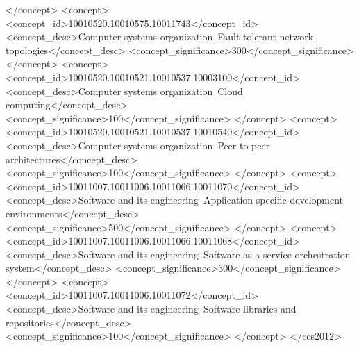 \begin{CCSXML}
       </concept>
   <concept>
       <concept_id>10010520.10010575.10011743</concept_id>
       <concept_desc>Computer systems organization~Fault-tolerant network topologies</concept_desc>
       <concept_significance>300</concept_significance>
       </concept>
   <concept>
       <concept_id>10010520.10010521.10010537.10003100</concept_id>
       <concept_desc>Computer systems organization~Cloud computing</concept_desc>
       <concept_significance>100</concept_significance>
       </concept>
   <concept>
       <concept_id>10010520.10010521.10010537.10010540</concept_id>
       <concept_desc>Computer systems organization~Peer-to-peer architectures</concept_desc>
       <concept_significance>100</concept_significance>
       </concept>
   <concept>
       <concept_id>10011007.10011006.10011066.10011070</concept_id>
       <concept_desc>Software and its engineering~Application specific development environments</concept_desc>
       <concept_significance>500</concept_significance>
       </concept>
   <concept>
       <concept_id>10011007.10011006.10011066.10011068</concept_id>
       <concept_desc>Software and its engineering~Software as a service orchestration system</concept_desc>
       <concept_significance>300</concept_significance>
       </concept>
   <concept>
       <concept_id>10011007.10011006.10011072</concept_id>
       <concept_desc>Software and its engineering~Software libraries and repositories</concept_desc>
       <concept_significance>100</concept_significance>
       </concept>
 </ccs2012>
\end{CCSXML}

